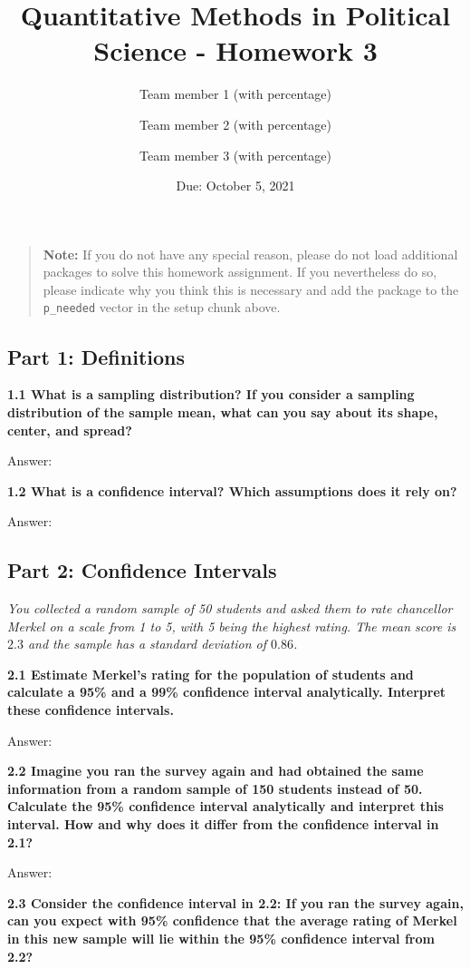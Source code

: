 \documentclass[
]{article}
\title{Quantitative Methods in Political Science - Homework 3}
\author{Team member 1 (with percentage) \and Team member 2 (with
percentage) \and Team member 3 (with percentage)}
\date{Due: October 5, 2021}
\begin{document}
\maketitle

\begin{quote}
\textbf{Note:} If you do not have any special reason, please do not load
additional packages to solve this homework assignment. If you
nevertheless do so, please indicate why you think this is necessary and
add the package to the \texttt{p\_needed} vector in the setup chunk
above.
\end{quote}

\hypertarget{part-1-definitions}{%
\subsection{Part 1: Definitions}\label{part-1-definitions}}

\textbf{1.1 What is a sampling distribution? If you consider a sampling
distribution of the sample mean, what can you say about its shape,
center, and spread?}

Answer:

\textbf{1.2 What is a confidence interval? Which assumptions does it
rely on?}

Answer:

\hypertarget{part-2-confidence-intervals}{%
\subsection{Part 2: Confidence
Intervals}\label{part-2-confidence-intervals}}

\emph{You collected a random sample of 50 students and asked them to
rate chancellor Merkel on a scale from 1 to 5, with 5 being the highest
rating. The mean score is \(2.3\) and the sample has a standard
deviation of \(0.86\).}

\textbf{2.1 Estimate Merkel's rating for the population of students and
calculate a 95\% and a 99\% confidence interval analytically. Interpret
these confidence intervals.}

Answer:

\textbf{2.2 Imagine you ran the survey again and had obtained the same
information from a random sample of 150 students instead of 50.
Calculate the 95\% confidence interval analytically and interpret this
interval. How and why does it differ from the confidence interval in
2.1?}

Answer:

\textbf{2.3 Consider the confidence interval in 2.2: If you ran the
survey again, can you expect with 95\% confidence that the average
rating of Merkel in this new sample will lie within the 95\% confidence
interval from 2.2?}
\end{document}
